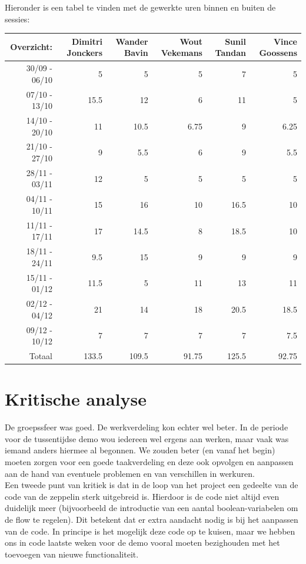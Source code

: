 \documentclass[eind]{penoverslag}
\begin{document}
Hieronder is een tabel te vinden met de gewerkte uren binnen en buiten de sessies: \\

\begin{tabular}{r||r|r|r|r|r}
Overzicht: & Dimitri Jonckers & Wander Bavin & Wout Vekemans & Sunil Tandan & Vince Goossens \\
\hline \hline 
30/09 - 06/10 & 5 & 5 & 5 & 7 & 5 \\
07/10 - 13/10 & 15.5 & 12 & 6 & 11 & 5 \\
14/10 - 20/10 & 11 & 10.5 & 6.75 & 9 & 6.25 \\
21/10 - 27/10 & 9 & 5.5 & 6 & 9 & 5.5 \\
28/11 - 03/11 & 12 & 5 & 5 & 5 & 5 \\
04/11 - 10/11 & 15 & 16 & 10 & 16.5 & 10 \\
11/11 - 17/11 & 17 & 14.5 & 8 & 18.5 & 10 \\
18/11 - 24/11 & 9.5 & 15 & 9 & 9 & 9 \\
15/11 - 01/12 & 11.5 & 5 & 11 & 13 & 11 \\
02/12 - 04/12 & 21 & 14 & 18 & 20.5 & 18.5 \\
09/12 - 10/12 & 7 & 7 & 7 & 7 & 7.5 \\
\hline \hline
Totaal & 133.5 & 109.5 & 91.75 & 125.5 & 92.75 \\
\end{tabular}

\section{Kritische analyse}
De groepssfeer was goed. De werkverdeling kon echter wel beter. In de periode voor de tussentijdse demo wou iedereen wel ergens aan werken, maar vaak was iemand anders hiermee al begonnen. We zouden beter (en vanaf het begin) moeten zorgen voor een goede taakverdeling en deze ook opvolgen en aanpassen aan de hand van eventuele problemen en van verschillen in werkuren. \\

Een tweede punt van kritiek is dat in de loop van het project een gedeelte van de code van de zeppelin sterk uitgebreid is. Hierdoor is de code niet altijd even duidelijk meer (bijvoorbeeld de introductie van een aantal boolean-variabelen om de flow te regelen). Dit betekent dat er extra aandacht nodig is bij het aanpassen van de code. In principe is het mogelijk deze code op te kuisen, maar we hebben ons in code laatste weken voor de demo vooral moeten bezighouden met het toevoegen van nieuwe functionaliteit. \\
\end{document}
